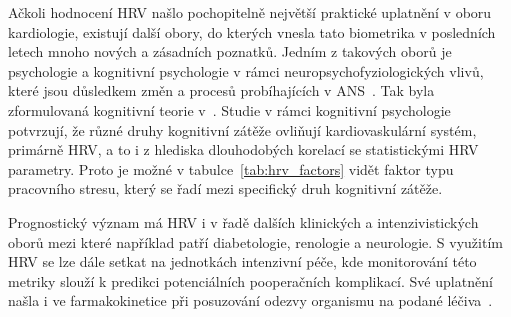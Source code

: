 Ačkoli hodnocení HRV našlo pochopitelně největší praktické uplatnění v oboru
kardiologie, existují další obory, do kterých vnesla tato biometrika v
posledních letech mnoho nových a zásadních poznatků. Jedním z takových oborů je psychologie
a kognitivní psychologie v rámci neuropsychofyziologických vlivů, které jsou
důsledkem změn a procesů probíhajících v ANS~\cite{Bernardi2009}. Tak byla
zformulovaná kognitivní teorie v~\cite{Forte2019,Plass2010}. Studie v rámci
kognitivní
psychologie~\cite{Bernardi2009,Solhjoo2019,Salahuddin2007,Ishaque2020}
potvrzují, že různé druhy kognitivní zátěže ovliňují kardiovaskulární systém,
primárně HRV, a to i z hlediska dlouhodobých korelací se statistickými HRV
parametry. Proto je možné v tabulce~\ref{tab:hrv_factors} vidět faktor typu
pracovního stresu, který se řadí mezi specifický druh kognitivní zátěže.

Prognostický význam má HRV i v řadě dalších klinických a intenzivistických oborů
mezi které například patří diabetologie, renologie a neurologie. S využitím HRV
se lze dále setkat na jednotkách intenzivní péče, kde monitorování této metriky
slouží k predikci potenciálních pooperačních komplikací. Své uplatnění našla i
ve farmakokinetice při posuzování odezvy organismu na podané
léčiva~\cite{Pumprla2014}.

